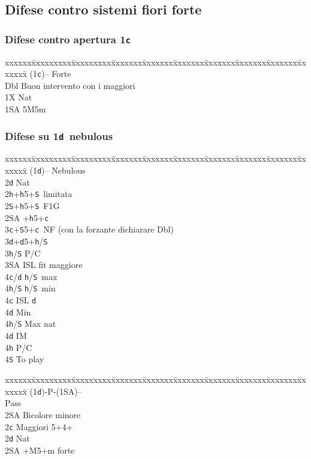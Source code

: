 \documentclass[a4paper,italian]{article}
\newcommand{\BS}{\small{\texttt{S}}}
\newcommand{\BC}{\small{\texttt{c}}}
\newcommand{\BD}{\small{\texttt{d}}}
\newcommand{\BH}{\small{\texttt{h}}}
\newcommand{\pdfc}{\texorpdfstring{\texttt{c}}{C}}
\newcommand{\pdfd}{\texorpdfstring{\texttt{d}}{D}}
\newenvironment{bidtable}
{\begin{tabbing}

    xxxxxx\=xxxxxxxxx\=xxxxxxxxx\=xxxxxxx\=xxxxxxx\=xxxxxxx\=xxxxxxx\=xxxxxxx\=xxxxxxx\=xxxxxxx\=\kill}
{\end{tabbing} }%
\begin{document}
\begin{multicols}{2}
    \subsection{Difese contro sistemi fiori forte}

    \subsubsection{Difese contro apertura 1\pdfc}

    \begin{bidtable}
        (1\BC)--\> Forte\+\\
        Dbl \> Buon intervento con i maggiori\\
        1X\> Nat\\
        1\small{SA}\> 5M5m
    \end{bidtable}

    \subsubsection{Difese su 1\pdfd\ nebulous}

    \begin{bidtable}
        (1\BD)-- \> Nebulous\+\\
        2\BD \> Nat\\
        2\BH {}+\BH 5+\BS\ limitata\\
        2\BS {}+\BH 5+\BS\ F1G\\
        2\small{SA} +\BH 5+\BC \\
        3\BC {}+\BS 5+\BC\ NF (con la forzante dichiarare Dbl)\\
        3\BD {}+\BD 5+\BH /\BS \+\\
        3\BH/\BS \> P/C\\
        3\small{SA} \> ISL fit maggiore\+\\
        4\BC/\BD \> \BH /\BS\ max\\
        4\BH/\BS \> \BH /\BS\ min\-\\
        4\BC \> ISL \BD \+\\
        4\BD \> Min\\
        4\BH/\BS \> Max nat\-\\
        4\BD \> IM\\
        4\BH \> P/C\\
        4\BS \> To play\-\-
    \end{bidtable}
    \begin{bidtable}
        (1\BD)-P-(1\small{SA})--\+\\
        Pass\+\\
        2\small{SA} \> Bicolore minore\-\\
        2\BC \> Maggiori 5+4+\\
        2\BD \> Nat\\
        2\small{SA} +M5+m forte\-
    \end{bidtable}
\vfill\null
    \columnbreak


\end{multicols}
\end{document}
